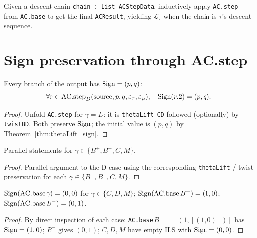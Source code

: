 \begin{definition}
  \label{def:AC_fold}
  \leanok
  Given a descent chain \texttt{chain : List ACStepData}, inductively apply
  \texttt{AC.step} from \texttt{AC.base} to get the final \texttt{ACResult},
  yielding $\mathcal{L}_\tau$ when the chain is $\tau$'s descent sequence.
\end{definition}

\section{Sign preservation through AC.step}

\begin{theorem}[AC.step preserves signature ($\gamma = D$)]
  \label{thm:AC_step_sign_D}
  \leanok
  Every branch of the output has $\mathrm{Sign} = (p, q)$:
  \[ \forall r \in \mathrm{AC.step}_{D}(\mathrm{source}, p, q, \varepsilon_\tau, \varepsilon_\wp),\quad \mathrm{Sign}(r.2) = (p, q). \]
\end{theorem}
\begin{proof}
  \leanok
  Unfold \texttt{AC.step} for $\gamma = D$: it is \texttt{thetaLift\_CD} followed (optionally) by \texttt{twistBD}. Both preserve $\mathrm{Sign}$; the initial value is $(p, q)$ by Theorem~\ref{thm:thetaLift_sign}.
\end{proof}


\begin{theorem}
  \label{thm:AC_step_sign_all}
  \leanok
  Parallel statements for $\gamma \in \{B^+, B^-, C, M\}$.
\end{theorem}
\begin{proof}
  \leanok
  Parallel argument to the D case using the corresponding \texttt{thetaLift} / twist preservation for each $\gamma \in \{B^+, B^-, C, M\}$.
\end{proof}


\begin{theorem}
  \label{thm:AC_base_sign}
  \leanok
  $\mathrm{Sign}(\mathrm{AC.base}\,\gamma) = (0, 0)$ for $\gamma \in \{C, D, M\}$; $\mathrm{Sign}(\mathrm{AC.base}\,B^+) = (1, 0)$; $\mathrm{Sign}(\mathrm{AC.base}\,B^-) = (0, 1)$.
\end{theorem}
\begin{proof}
  \leanok
  By direct inspection of each case: \texttt{AC.base}$\,B^+ = [(1, [(1, 0)])]$ has $\mathrm{Sign} = (1, 0)$; $B^-$ gives $(0, 1)$; $C, D, M$ have empty ILS with $\mathrm{Sign} = (0, 0)$.
\end{proof}


